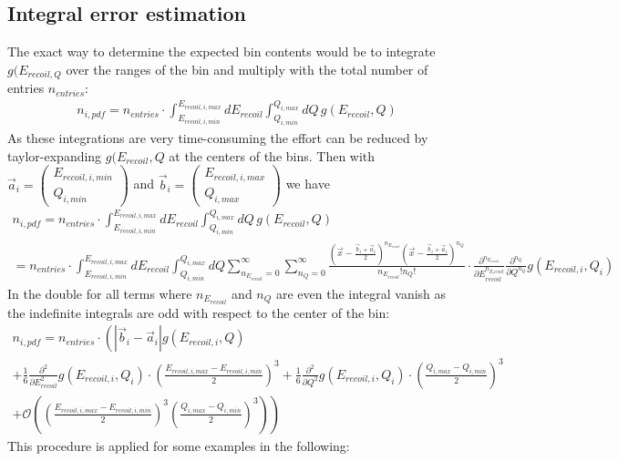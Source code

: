 \documentclass[10pt, a4paper]{article}
\begin{document}
\subsection{Integral error estimation}
The exact way to determine the expected bin contents would be to integrate $g(E_{recoil,Q}$ over the ranges of the bin and multiply with the total number of entries $n_{entries}$:
\begin{gather}
n_{i,pdf} = n_{entries} \cdot \int_{E_{recoil,i,min}}^{E_{recoil,i,max}} dE_{recoil} \int_{Q_{i,min}}^{Q_{i,max}} dQ \, g(E_{recoil},Q)
\end{gather}
As these integrations are very time-consuming the effort can be reduced by taylor-expanding $g(E_{recoil},Q$ at the centers of the bins.
Then with $\vec{a}_i = \begin{pmatrix} E_{recoil,i,min} \\ Q_{i,min} \end{pmatrix}$ and $\vec{b}_i = \begin{pmatrix} E_{recoil,i,max} \\ Q_{i,max} \end{pmatrix}$ we have
\begin{gather}
n_{i,pdf} = n_{entries} \cdot \int_{E_{recoil,i,min}}^{E_{recoil,i,max}} dE_{recoil} \int_{Q_{i,min}}^{Q_{i,max}} dQ \, g(E_{recoil},Q) \\
 = n_{entries} \cdot \int_{E_{recoil,i,min}}^{E_{recoil,i,max}} dE_{recoil} \int_{Q_{i,min}}^{Q_{i,max}} dQ \sum_{n_{E_{recoil}} = 0}^\infty \sum_{n_{Q} = 0}^\infty
\frac{\left( \vec{x} - \frac{\vec{b}_i + \vec{a}_i}{2} \right)^{n_{E_{recoil}}} \left( \vec{x} - \frac{\vec{b}_i + \vec{a}_i}{2} \right)^{n_{Q}}}{n_{E_{recoil}}! n_Q!}
\cdot \frac{\partial^{n_{E_{recoil}}}}{\partial E_{recoil} ^{n_{E_recoil}}} \frac{\partial^{n_{Q}}}{\partial Q^{n_{Q}}} g(E_{recoil,i},Q_i)
\end{gather}
In the double for all terms where $n_{E_{recoil}}$ and $n_{Q}$ are even the integral vanish as the indefinite integrals are odd with respect to the center of the bin:
\begin{gather}
n_{i,pdf} = n_{entries} \cdot \left(  \left| \vec{b}_i - \vec{a}_i \right| g(E_{recoil,i},Q) \right. \\
+ \frac{1}{6} \frac{\partial^2}{\partial E_{recoil}^2} g(E_{recoil,i},Q_i) \cdot \left( \frac{E_{recoil,i,max} - E_{recoil,i,min}}{2} \right)^3 
+ \frac{1}{6} \frac{\partial^2}{\partial Q^2} g(E_{recoil,i},Q_i) \cdot \left( \frac{Q_{i,max} - Q_{i,min}}{2} \right)^3  \\
+ \left. \mathcal O \left( \left( \frac{E_{recoil,i,max} - E_{recoil,i,min}}{2} \right)^3 \left( \frac{Q_{i,max} - Q_{i,min}}{2} \right)^3 \right) \right)
\end{gather}
This procedure is applied for some examples in the following: \\[0.5cm]
\end{document}
